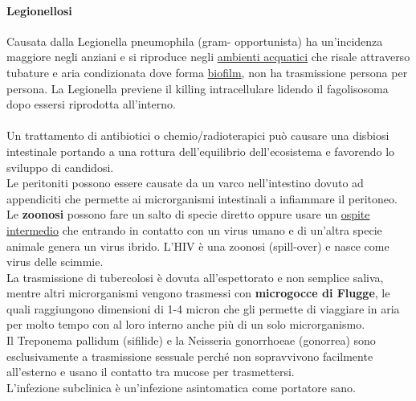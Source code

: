 \documentclass[10pt]{article}
\begin{document}
\paragraph*{Legionellosi} Causata dalla Legionella pneumophila (gram- opportunista) ha un'incidenza maggiore negli anziani e si riproduce negli \underline{ambienti acquatici} che risale attraverso tubature e aria condizionata dove forma \underline{biofilm}, non ha trasmissione persona per persona. La Legionella previene il killing intracellulare lidendo il fagolisosoma dopo essersi riprodotta all'interno. \\
\\
Un trattamento di antibiotici o chemio/radioterapici può causare una disbiosi intestinale portando a una rottura dell'equilibrio dell'ecosistema e favorendo lo sviluppo di candidosi. \\
Le peritoniti possono essere causate da un varco nell'intestino dovuto ad appendiciti che permette ai microrganismi intestinali a infiammare il peritoneo.\\
Le \textbf{zoonosi} possono fare un salto di specie diretto oppure usare un \underline{ospite intermedio} che entrando in contatto con un virus umano e di un'altra specie animale genera un virus ibrido. L'HIV è una zoonosi (spill-over) e nasce come virus delle scimmie.\\
La trasmissione di tubercolosi è dovuta all'espettorato e non semplice saliva, mentre altri microrganismi vengono trasmessi con \textbf{microgocce di Flugge}, le quali raggiungono dimensioni di 1-4 micron che gli permette di viaggiare in aria per molto tempo con al loro interno anche più di un solo microrganismo.\\
Il Treponema pallidum (sifilide) e la Neisseria gonorrhoeae (gonorrea) sono esclusivamente a trasmissione sessuale perché non sopravvivono facilmente all'esterno e usano il contatto tra mucose per trasmettersi. \\
L'infezione subclinica è un'infezione asintomatica come portatore sano. \\
\end{document}
